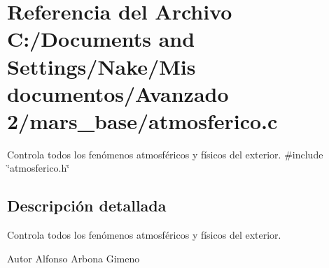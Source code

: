 \section{Referencia del Archivo C:/Documents and Settings/Nake/Mis documentos/Avanzado 2/mars\_\-base/atmosferico.c}
\label{atmosferico_8c}


Controla todos los fenómenos atmosféricos y físicos del exterior.  
{\ttfamily \#include \char`\"{}atmosferico.h\char`\"{}}\par


\subsection{Descripción detallada}
Controla todos los fenómenos atmosféricos y físicos del exterior. \begin{DoxyAuthor}{Autor}
Alfonso Arbona Gimeno 
\end{DoxyAuthor}
